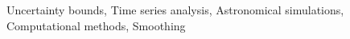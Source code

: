 \documentclass[]{article}
\begin{document}
Uncertainty bounds, Time series analysis, Astronomical simulations, Computational methods, Smoothing
\end{document}
